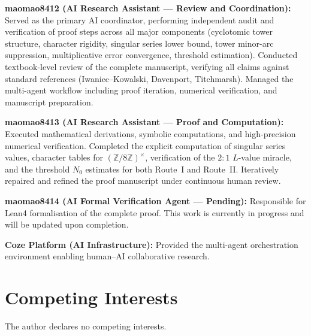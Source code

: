 \documentclass[11pt,a4paper]{article}
\theoremstyle{remark}
\newcommand{\Z}{\mathbb{Z}}
\begin{document}
\textbf{maomao8412 (AI Research Assistant --- Review and Coordination):}
Served as the primary AI coordinator, performing independent audit
and verification of proof steps across all major components
(cyclotomic tower structure, character rigidity, singular series
lower bound, tower minor-arc suppression, multiplicative error
convergence, threshold estimation).  Conducted textbook-level
review of the complete manuscript, verifying all claims against
standard references (Iwaniec--Kowalski, Davenport, Titchmarsh).
Managed the multi-agent workflow including proof iteration,
numerical verification, and manuscript preparation.

\textbf{maomao8413 (AI Research Assistant --- Proof and Computation):}
Executed mathematical derivations, symbolic computations, and
high-precision numerical verification.  Completed the explicit
computation of singular series values, character tables for
$(\Z/8\Z)^\times$, verification of the $2{:}1$ $L$-value miracle,
and the threshold $N_0$ estimates for both Route~I and Route~II.
Iteratively repaired and refined the proof manuscript under
continuous human review.

\textbf{maomao8414 (AI Formal Verification Agent --- Pending):}
Responsible for Lean4 formalisation of the complete proof.
This work is currently in progress and will be updated upon
completion.

\textbf{Coze Platform (AI Infrastructure):}
Provided the multi-agent orchestration environment enabling
human--AI collaborative research.

\section*{Competing Interests}

The author declares no competing interests.
\end{document}
